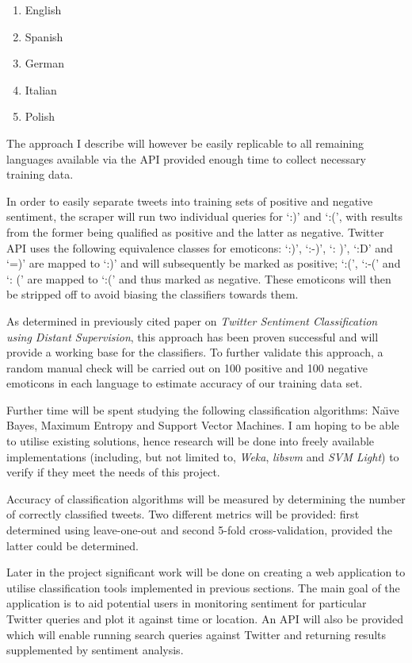 \begin{enumerate}

\item English
\item Spanish
\item German
\item Italian
\item Polish

\end{enumerate}

The approach I describe will however be easily replicable to all remaining languages available via the API provided enough time to collect necessary training data.

In order to easily separate tweets into training sets of positive and negative sentiment, the scraper will run two individual queries for `:)' and `:(', with results from the former being qualified as positive and the latter as negative. Twitter API uses the following equivalence classes for emoticons: `:)', `:-)', `: )', `:D' and `=)' are mapped to `:)' and will subsequently be marked as positive; `:(', `:-(' and `: (' are mapped to `:(' and thus marked as negative. These emoticons will then be stripped off to avoid biasing the classifiers towards them.

As determined in previously cited paper on \emph{Twitter Sentiment Classification using Distant Supervision}, this approach has been proven successful and will provide a working base for the classifiers. To further validate this approach, a random manual check will be carried out on 100 positive and 100 negative emoticons in each language to estimate accuracy of our training data set.

Further time will be spent studying the following classification algorithms: Na\"{\i}ve Bayes, Maximum Entropy and Support Vector Machines. I am hoping to be able to utilise existing solutions, hence research will be done into freely available implementations (including, but not limited to, \emph{Weka}, \emph{libsvm} and \emph{SVM Light}) to verify if they meet the needs of this project.

Accuracy of classification algorithms will be measured by determining the number of correctly classified tweets. Two different metrics will be provided: first determined using leave-one-out and second 5-fold cross-validation, provided the latter could be determined.

Later in the project significant work will be done on creating a web application to utilise classification tools implemented in previous sections. The main goal of the application is to aid potential users in monitoring sentiment for particular Twitter queries and plot it against time or location. An API will also be provided which will enable running search queries against Twitter and returning results supplemented by sentiment analysis.

